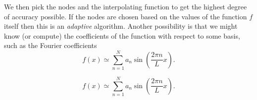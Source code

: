 \documentclass{beamer}
\begin{document}
\begin{frame}
\begin{columns}
\begin{column}{0.5\textwidth}
\begin{overlayarea}{\textwidth}{0.6\textheight}
{        }
        {
          \vspace{1ex}
          We then pick the nodes and the interpolating function to
          get the highest degree of accuracy possible. If the nodes
          are chosen based on the values of the function $f$ itself
          then this is an \emph{adaptive} algorithm.
        }
        {
          Another possibility is that we might know (or compute) the
          coefficients of the function with respect to some basis,
          such as the Fourier coefficients
          \begin{equation*}
            f(x) \simeq \sum_{n=1}^N a_n \sin \left(\frac{2 \pi n}{L}
              x\right).
          \end{equation*}
        }
        {
          \begin{equation*}
            f(x) \simeq \sum_{n=1}^N a_n \sin \left(\frac{2 \pi n}{L}
              x\right).
          \end{equation*}

}
\end{overlayarea}
\end{column}
\end{columns}
\end{frame}
\end{document}

